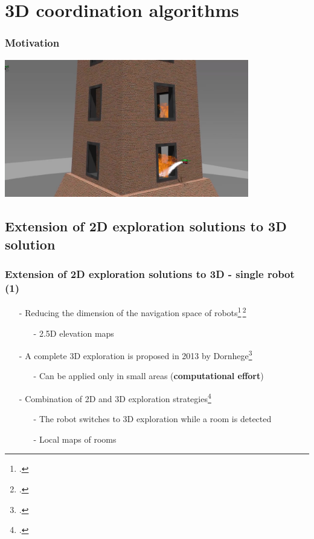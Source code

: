\section{3D coordination algorithms}

\begin{frame}
	\frametitle{Motivation}
	\centering
	\href{mbzirc_video.mp4}{\includegraphics[width=0.8\textwidth]{figures/mbzirc_screen.jpg}}
	
\end{frame}

\subsection{Extension of 2D exploration solutions to 3D solution}
\begin{frame}
     \frametitle{Extension of 2D exploration solutions to 3D - single robot (1)}
     \begin{itemize}
     	\item[-] Reducing the dimension of the navigation space of robots\footcite{Bachrach2009}$\,$\footcite{Surmann2003}
     	\begin{itemize}
     		\item[-] 2.5D elevation maps 
     	\end{itemize}	
     	\item[-] A complete 3D exploration is proposed in 2013 by Dornhege\footcite{Dornhege2013}
     	 	\begin{itemize}
     			\item[-] Can be applied only in small areas (\textbf{computational effort})
     	 	\end{itemize}
      	\item[-] Combination of 2D and 3D exploration strategies\footcite{Maurovic2014}
      	\begin{itemize}
      		\item[-] The robot switches to 3D exploration while a room is detected
      		\item[-] Local maps of rooms
      	\end{itemize}		
     \end{itemize}   
\end{frame}

